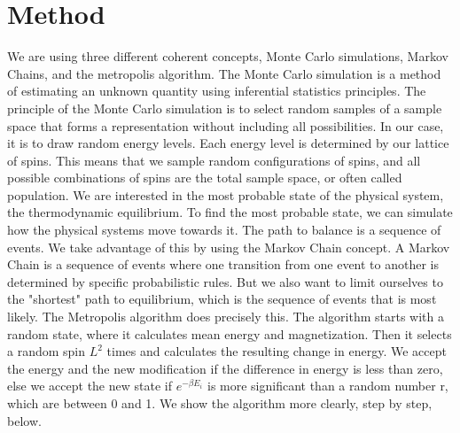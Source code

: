 \documentclass{article}
\begin{document}
\newpage
\section{Method}
We are using three different coherent concepts, Monte Carlo simulations, Markov Chains, and the metropolis algorithm. The Monte Carlo simulation is a method of estimating an unknown quantity using inferential statistics principles. The principle of the Monte Carlo simulation is to select random samples of a sample space that forms a representation without including all possibilities. In our case, it is to draw random energy levels. Each energy level is determined by our lattice of spins. This means that we sample random configurations of spins, and all possible combinations of spins are the total sample space, or often called population. \newline
\newline
\noindent
We are interested in the most probable state of the physical system, the thermodynamic equilibrium. To find the most probable state, we can simulate how the physical systems move towards it. 
The path to balance is a sequence of events. We take advantage of this by using the Markov Chain concept. A Markov Chain is a sequence of events where one transition from one event to another is determined by specific probabilistic rules. But we also want to limit ourselves to the "shortest" path to equilibrium, which is the sequence of events that is most likely. The Metropolis algorithm does precisely this. The algorithm starts with a random state, where it calculates mean energy and magnetization. Then it selects a random spin $L^2$ times and calculates the resulting change in energy. We accept the energy and the new modification if the difference in energy is less than zero, else we accept the new state if $e^{-\beta E_i}$ is more significant than a random number r, which are between 0 and 1. We show the algorithm more clearly, step by step, below.     
\end{document}
